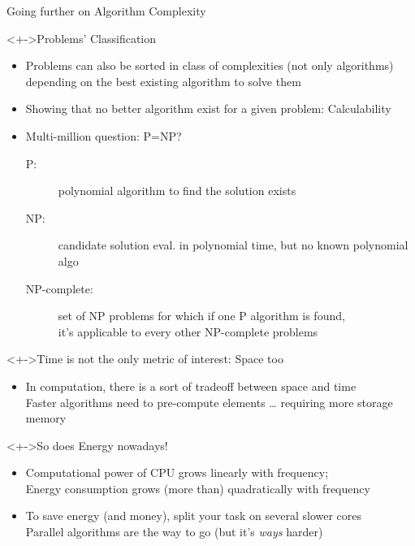 \begin{frame}{Going further on Algorithm Complexity}
  \vspace{-.5\baselineskip}
  \begin{block}<+->{Problems' Classification}
    \begin{itemize}\vspace{-.2\baselineskip}
    \item Problems can also be sorted in class of complexities (not only
      algorithms)\\
      {\small depending on the best existing algorithm to solve them}
    \item Showing that no better algorithm exist for a given problem:
      \alert{Calculability}
    \item Multi-million question: \alert{P=NP?}
      \begin{description}
      \item[P:] polynomial algorithm to find the solution exists
      \item[NP:] {\small candidate solution eval. in polynomial time, but no
          known polynomial algo}
      \item[NP-complete:] set of NP problems for which if one P algorithm is
        found, \\
        it's applicable to every other NP-complete problems
      \end{description}
    \end{itemize}
  \end{block}\vspace{-.5\baselineskip}

  \begin{block}<+->{\alert{Time} is not the only metric of interest:
      \alert{Space} too}
    \begin{itemize}\vspace{-.2\baselineskip}
    \item In computation, there is a sort of tradeoff between space and time\\
      {\small  Faster algorithms need to pre-compute elements \ldots
        requiring more storage memory}
    \end{itemize}
  \end{block}\vspace{-.5\baselineskip}

  \begin{block}<+->{So does \alert{Energy} nowadays!}
    \begin{itemize}\vspace{-.2\baselineskip}
    \item Computational power of CPU grows linearly with frequency;\\
      Energy consumption grows (more than) quadratically with frequency
    \item To save energy (and money), split your task on several
      slower cores \\
      {\small Parallel algorithms are the way to go (but it's \textit{ways}
        harder)}
    \end{itemize}
  \end{block}
\end{frame}
